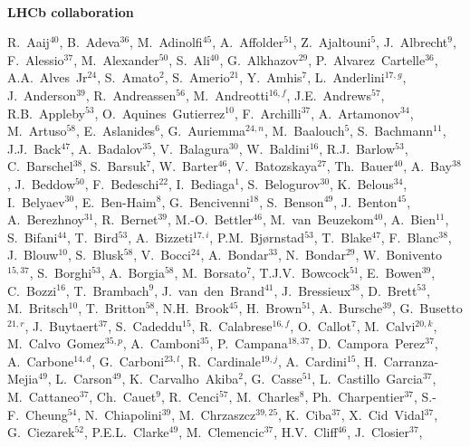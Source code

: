 \documentclass[12pt,a4paper]{article}
\begin{document}
\newpage
\setcounter{page}{2}
\mbox{~}


\centerline{\large\bf LHCb collaboration}
\begin{flushleft}
\small
R.~Aaij$^{40}$, 
B.~Adeva$^{36}$, 
M.~Adinolfi$^{45}$, 
A.~Affolder$^{51}$, 
Z.~Ajaltouni$^{5}$, 
J.~Albrecht$^{9}$, 
F.~Alessio$^{37}$, 
M.~Alexander$^{50}$, 
S.~Ali$^{40}$, 
G.~Alkhazov$^{29}$, 
P.~Alvarez~Cartelle$^{36}$, 
A.A.~Alves~Jr$^{24}$, 
S.~Amato$^{2}$, 
S.~Amerio$^{21}$, 
Y.~Amhis$^{7}$, 
L.~Anderlini$^{17,g}$, 
J.~Anderson$^{39}$, 
R.~Andreassen$^{56}$, 
M.~Andreotti$^{16,f}$, 
J.E.~Andrews$^{57}$, 
R.B.~Appleby$^{53}$, 
O.~Aquines~Gutierrez$^{10}$, 
F.~Archilli$^{37}$, 
A.~Artamonov$^{34}$, 
M.~Artuso$^{58}$, 
E.~Aslanides$^{6}$, 
G.~Auriemma$^{24,n}$, 
M.~Baalouch$^{5}$, 
S.~Bachmann$^{11}$, 
J.J.~Back$^{47}$, 
A.~Badalov$^{35}$, 
V.~Balagura$^{30}$, 
W.~Baldini$^{16}$, 
R.J.~Barlow$^{53}$, 
C.~Barschel$^{38}$, 
S.~Barsuk$^{7}$, 
W.~Barter$^{46}$, 
V.~Batozskaya$^{27}$, 
Th.~Bauer$^{40}$, 
A.~Bay$^{38}$, 
J.~Beddow$^{50}$, 
F.~Bedeschi$^{22}$, 
I.~Bediaga$^{1}$, 
S.~Belogurov$^{30}$, 
K.~Belous$^{34}$, 
I.~Belyaev$^{30}$, 
E.~Ben-Haim$^{8}$, 
G.~Bencivenni$^{18}$, 
S.~Benson$^{49}$, 
J.~Benton$^{45}$, 
A.~Berezhnoy$^{31}$, 
R.~Bernet$^{39}$, 
M.-O.~Bettler$^{46}$, 
M.~van~Beuzekom$^{40}$, 
A.~Bien$^{11}$, 
S.~Bifani$^{44}$, 
T.~Bird$^{53}$, 
A.~Bizzeti$^{17,i}$, 
P.M.~Bj\o rnstad$^{53}$, 
T.~Blake$^{47}$, 
F.~Blanc$^{38}$, 
J.~Blouw$^{10}$, 
S.~Blusk$^{58}$, 
V.~Bocci$^{24}$, 
A.~Bondar$^{33}$, 
N.~Bondar$^{29}$, 
W.~Bonivento$^{15,37}$, 
S.~Borghi$^{53}$, 
A.~Borgia$^{58}$, 
M.~Borsato$^{7}$, 
T.J.V.~Bowcock$^{51}$, 
E.~Bowen$^{39}$, 
C.~Bozzi$^{16}$, 
T.~Brambach$^{9}$, 
J.~van~den~Brand$^{41}$, 
J.~Bressieux$^{38}$, 
D.~Brett$^{53}$, 
M.~Britsch$^{10}$, 
T.~Britton$^{58}$, 
N.H.~Brook$^{45}$, 
H.~Brown$^{51}$, 
A.~Bursche$^{39}$, 
G.~Busetto$^{21,r}$, 
J.~Buytaert$^{37}$, 
S.~Cadeddu$^{15}$, 
R.~Calabrese$^{16,f}$, 
O.~Callot$^{7}$, 
M.~Calvi$^{20,k}$, 
M.~Calvo~Gomez$^{35,p}$, 
A.~Camboni$^{35}$, 
P.~Campana$^{18,37}$, 
D.~Campora~Perez$^{37}$, 
A.~Carbone$^{14,d}$, 
G.~Carboni$^{23,l}$, 
R.~Cardinale$^{19,j}$, 
A.~Cardini$^{15}$, 
H.~Carranza-Mejia$^{49}$, 
L.~Carson$^{49}$, 
K.~Carvalho~Akiba$^{2}$, 
G.~Casse$^{51}$, 
L.~Castillo~Garcia$^{37}$, 
M.~Cattaneo$^{37}$, 
Ch.~Cauet$^{9}$, 
R.~Cenci$^{57}$, 
M.~Charles$^{8}$, 
Ph.~Charpentier$^{37}$, 
S.-F.~Cheung$^{54}$, 
N.~Chiapolini$^{39}$, 
M.~Chrzaszcz$^{39,25}$, 
K.~Ciba$^{37}$, 
X.~Cid~Vidal$^{37}$, 
G.~Ciezarek$^{52}$, 
P.E.L.~Clarke$^{49}$, 
M.~Clemencic$^{37}$, 
H.V.~Cliff$^{46}$, 
J.~Closier$^{37}$, 

\end{flushleft}
\end{document}

